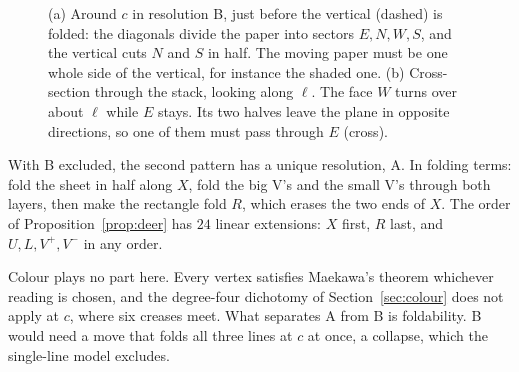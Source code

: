 \documentclass[11pt]{article}
\theoremstyle{definition}
\theoremstyle{remark}
\begin{document}
\begin{figure}[t]
\centering
{}
\caption{(a) Around $c$ in resolution B, just before the vertical (dashed) is folded: the diagonals divide the paper into sectors $E,N,W,S$, and the vertical cuts $N$ and $S$ in half. The moving paper must be one whole side of the vertical, for instance the shaded one. (b) Cross-section through the stack, looking along $\ell$. The face $W$ turns over about $\ell$ while $E$ stays. Its two halves leave the plane in opposite directions, so one of them must pass through $E$ (cross).}
\label{fig:sector}
\end{figure}

With B excluded, the second pattern has a unique resolution, A. In folding terms: fold the sheet in half along $X$, fold the big V's and the small V's through both layers, then make the rectangle fold $R$, which erases the two ends of $X$. The order of Proposition~\ref{prop:deer} has $24$ linear extensions: $X$ first, $R$ last, and $U,L,V^+,V^-$ in any order.

Colour plays no part here. Every vertex satisfies Maekawa's theorem whichever reading is chosen, and the degree-four dichotomy of Section~\ref{sec:colour} does not apply at $c$, where six creases meet. What separates A from B is foldability. B would need a move that folds all three lines at $c$ at once, a collapse, which the single-line model excludes.
\end{document}
